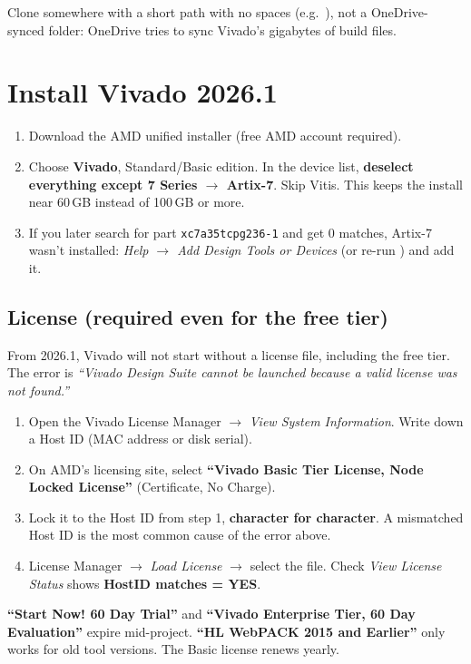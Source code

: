 \documentclass[11pt]{article}
\begin{document}
Clone somewhere with a short path with no spaces (e.g.\ ),
not a OneDrive-synced folder: OneDrive tries to sync Vivado's gigabytes of build files.

\section{Install Vivado 2026.1}
\begin{enumerate}
  \item Download the AMD unified installer (free AMD account required).
  \item Choose \textbf{Vivado}, Standard/Basic edition. In the device list,
        \textbf{deselect everything except 7 Series $\rightarrow$ Artix-7}. Skip Vitis.
        This keeps the install near 60\,GB instead of 100\,GB or more.
  \item If you later search for part \texttt{xc7a35tcpg236-1} and get 0 matches, Artix-7
        wasn't installed: \emph{Help $\rightarrow$ Add Design Tools or Devices}
        (or re-run ) and add it.
\end{enumerate}

\subsection{License (required even for the free tier)}
From 2026.1, Vivado will not start without a license file, including the free
tier. The error is \emph{``Vivado Design Suite cannot be launched because a
valid license was not found.''}
\begin{enumerate}
  \item Open the Vivado License Manager $\rightarrow$ \emph{View System Information}.
        Write down a Host ID (MAC address or disk serial).
  \item On AMD's licensing site, select \textbf{``Vivado Basic Tier License, Node
        Locked License''} (Certificate, No Charge).
  \item Lock it to the Host ID from step 1, \textbf{character for character}.
        A mismatched Host ID is the most common cause of the error above.
  \item License Manager $\rightarrow$ \emph{Load License} $\rightarrow$ select the
         file. Check \emph{View License Status} shows
        \textbf{HostID matches = YES}.
\end{enumerate}
\begin{warn}
\textbf{``Start Now! 60 Day Trial''} and \textbf{``Vivado Enterprise Tier, 60 Day
Evaluation''} expire mid-project. \textbf{``HL WebPACK 2015 and Earlier''} only
works for old tool versions. The Basic license renews yearly.
\end{warn}
\end{document}

